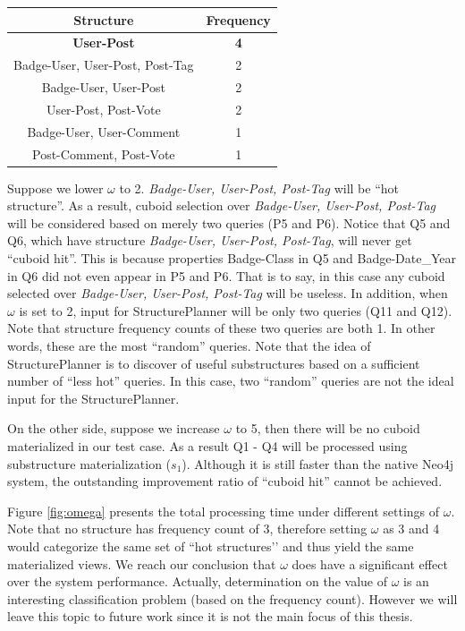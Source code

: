 \begin{center}
	\begin{tabular}{ | c | c |}
		\hline
		Structure	&Frequency	\\ \hline
		\textbf{User-Post} 	&\textbf{4} \\ \hline
		Badge-User, User-Post, Post-Tag 	&2 \\ \hline
		Badge-User, User-Post	&2 \\ \hline
		User-Post, Post-Vote	&2 \\ \hline
		Badge-User, User-Comment	&1 \\ \hline
		Post-Comment, Post-Vote	&1 \\ \hline
	\end{tabular}
	\end {center}
	
	Suppose we lower $\omega$ to 2. \textit{Badge-User, User-Post, Post-Tag} will be ``hot structure''. As a result, cuboid selection over \textit{Badge-User, User-Post, Post-Tag} will be considered based on merely two queries (P5 and P6). Notice that Q5 and Q6, which have structure \textit{Badge-User, User-Post, Post-Tag}, will never get ``cuboid hit''. This is because properties Badge-Class in Q5 and Badge-Date\_Year in Q6 did not even appear in P5 and P6. That is to say, in this case any cuboid selected over \textit{Badge-User, User-Post, Post-Tag} will be useless. In addition, when $\omega$ is set to 2, input for StructurePlanner will be only two queries (Q11 and Q12). Note that structure frequency counts of these two queries are both 1. In other words, these are the most ``random'' queries. Note that the idea of StructurePlanner is to discover of useful substructures based on a sufficient number of ``less hot'' queries. In this case, two ``random'' queries are not the ideal input for the StructurePlanner.
	
	On the other side, suppose we increase $\omega$ to 5, then there will be no cuboid materialized in our test case. As a result Q1 - Q4 will be processed using substructure materialization ($s_1$). Although it is still faster than the native Neo4j system, the outstanding improvement ratio of ``cuboid hit'' cannot be achieved.
	
	Figure \ref{fig:omega} presents the total processing time under different settings of $\omega$. Note that no structure has frequency count of 3, therefore setting $\omega$ as 3 and 4 would categorize the same set of ``hot structures’’ and thus yield the same materialized views. We reach our conclusion that $\omega$ does have a significant effect over the system performance. Actually, determination on the value of $\omega$ is an interesting classification problem (based on the frequency count). However we will leave this topic to future work since it is not the main focus of this thesis.
	
